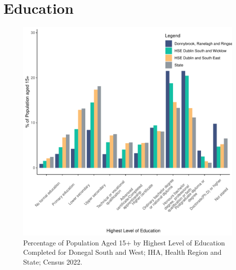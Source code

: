 \documentclass{article}
\begin{document}
\section{Education}\label{sect:Edu}
\begin{figure}[H]
	\centering
	\includegraphics[width = 120mm]{../figures/EduED.pdf}
	\caption{Percentage of Population Aged 15+ by Highest Level of Education Completed for Donegal South and West; IHA, Health Region and State; Census 2022.}
	\label{fig:vbnv}
	\end{figure}
\end{document}
